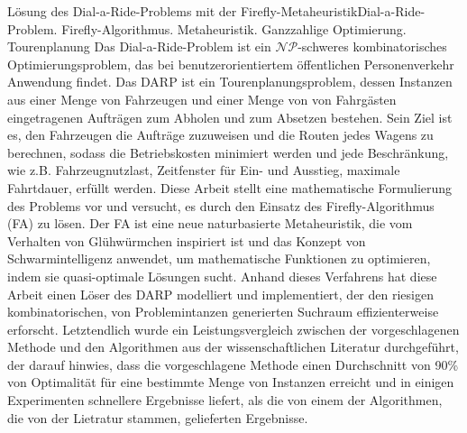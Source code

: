 \documentclass[tuberlin,cic,tc,openright,english,noabntcite,oneside]{iiufrgs}
\begin{document}
\begin{englishabstract}{Lösung des Dial-a-Ride-Problems mit der Firefly-Metaheuristik}{Dial-a-Ride-Problem. Firefly-Algorithmus. Metaheuristik. Ganzzahlige Optimierung. Tourenplanung}
Das Dial-a-Ride-Problem ist ein $\mathcal{NP}$-schweres kombinatorisches Optimierungsproblem, das bei benutzerorientiertem öffentlichen Personenverkehr Anwendung findet. Das DARP ist ein Tourenplanungsproblem, dessen Instanzen aus einer Menge von Fahrzeugen und einer Menge von von Fahrgästen eingetragenen Aufträgen zum Abholen und zum Absetzen bestehen. Sein Ziel ist es, den Fahrzeugen die Aufträge zuzuweisen und die Routen jedes Wagens zu berechnen, sodass die Betriebskosten minimiert werden und jede Beschränkung, wie z.B. Fahrzeugnutzlast, Zeitfenster für Ein- und Ausstieg, maximale Fahrtdauer, erfüllt werden. Diese Arbeit stellt eine mathematische Formulierung des Problems vor und versucht, es durch den Einsatz des Firefly-Algorithmus (FA) zu lösen. Der FA ist eine neue naturbasierte Metaheuristik, die vom Verhalten von Glühwürmchen inspiriert ist und das Konzept von Schwarmintelligenz anwendet, um mathematische Funktionen zu optimieren, indem sie quasi-optimale Lösungen sucht. Anhand dieses Verfahrens hat diese Arbeit einen Löser des DARP modelliert und implementiert, der den riesigen kombinatorischen, von Problemintanzen generierten Suchraum effizienterweise erforscht. Letztendlich wurde ein Leistungsvergleich zwischen der vorgeschlagenen Methode und den Algorithmen aus der wissenschaftlichen Literatur durchgeführt, der darauf hinwies, dass die vorgeschlagene Methode einen Durchschnitt von 90\% von Optimalität für eine bestimmte Menge von Instanzen erreicht und in einigen Experimenten schnellere Ergebnisse liefert, als die von einem der Algorithmen, die von der Lietratur stammen, gelieferten Ergebnisse.
\end{englishabstract}

\listoffigures

\listoftables
\end{document}

